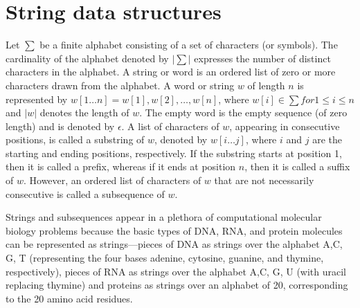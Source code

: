 \section{String data structures}

 Let $\sum$ be a finite alphabet consisting of a set of characters (or symbols). 
 The cardinality of the alphabet denoted by $|\sum|$ expresses
the number of distinct characters in the alphabet. 
A string or word is an ordered list of zero or more characters drawn from the alphabet. A word or string $w$ of length $n$ is
represented by $w[1 \ldots n] = w[1],w[2], \ldots ,w[n]$, where $w[i] \in \sum for 1 \leq i \leq n$ and
$|w|$ denotes the length of $w$. The empty word is the empty sequence (of zero length) and is denoted by $\epsilon$. A list of characters of $w$, appearing in consecutive positions, is called a substring of $w$, denoted by $w[i \ldots j]$, where $i$ and $j$ are the starting and
ending positions, respectively. If the substring starts at position 1, then it is called
a prefix, whereas if it ends at position $n$, then it is called a suffix of $w$. However,
an ordered list of characters of $w$ that are not necessarily consecutive is called a subsequence of $w$.

Strings and subsequences appear in a plethora of computational molecular biology
problems because the basic types of DNA, RNA, and protein molecules can be represented as strings—pieces of DNA as strings over the alphabet {A,C, G, T } (representing the four bases adenine, cytosine, guanine, and thymine, respectively), pieces of RNA as strings over the alphabet {A,C, G, U} (with uracil replacing thymine) and proteins as strings over an alphabet of 20, corresponding to the 20 amino acid
residues.

